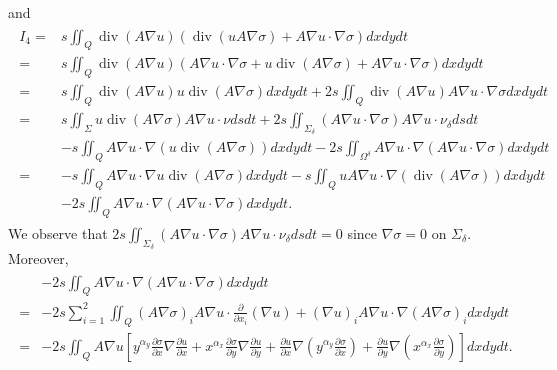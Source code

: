 \documentclass[9pt,reqno]{amsart}
\theoremstyle{plain}
\numberwithin{equation}{section}
\numberwithin{theorem}{section}
\DeclareMathOperator*{\Div}{\mathrm{div}}
\begin{document}
	and
	\begin{align*}
		\begin{split}
			I_4= & s \iint_Q \Div(A \nabla u)\left(  \Div(u A \nabla \sigma)+ A \nabla u \cdot \nabla \sigma\right)  dx dy dt \\%
			= & s \iint_Q \Div(A \nabla u)\left( A \nabla u \cdot \nabla \sigma+ u \Div(A \nabla \sigma)+ A \nabla u \cdot \nabla \sigma\right)  dx dy dt \\%
			= & s \iint_Q \Div(A \nabla u) u \Div(A \nabla \sigma)dx dy dt + 2s \iint_Q \Div(A \nabla u) A \nabla u \cdot \nabla \sigma   dx dy dt \\%
			= & s \iint_\Sigma u \Div(A \nabla \sigma )A \nabla u \cdot \nu dsdt + 2s \iint_{\Sigma_\delta}  (A \nabla u \cdot \nabla \sigma) A \nabla u \cdot \nu_\delta ds dt \\%
			&-s \iint_Q A \nabla u \cdot  \nabla\left( u \Div(A \nabla \sigma)\right) dx dy dt -2s \iint_{\Omega^\delta} A \nabla u\cdot \nabla \left( A \nabla u \cdot \nabla \sigma \right)  dx dy dt \\%
			= &
			-s \iint_Q A \nabla u \cdot  \nabla u \Div(A \nabla \sigma)dx dy dt-s \iint_Q u A \nabla u\cdot \nabla (\Div(A \nabla \sigma)) dx dy dt\\%
			&-2s \iint_{Q} A \nabla u\cdot \nabla(A \nabla u \cdot \nabla \sigma)   dx dy dt. 
		\end{split}
	\end{align*}
	We observe that $2s \iint_{\Sigma_\delta} (A \nabla u \cdot \nabla \sigma) A \nabla u \cdot \nu_\delta  ds  dt = 0$ since $\nabla \sigma = 0$ on $\Sigma_\delta$. Moreover,
	\begin{align*}
		\begin{split}
			&-2s \iint_{Q} A \nabla u \cdot \nabla (A\nabla u \cdot \nabla \sigma) dx dydt\\
			=&-2s \sum_{i=1}^{2} \iint_{Q} (A\nabla \sigma)_i A \nabla u \cdot \frac{\partial}{\partial x_i}(\nabla u) + (\nabla u)_i A \nabla u \cdot \nabla (A \nabla \sigma)_i dx dydt\\
			=&-2s \iint_{Q} A \nabla u \left[ y^{\alpha_y} \frac{\partial \sigma}{\partial x}\nabla \frac{\partial u}{\partial x}  + x^{\alpha_x} \frac{\partial \sigma}{\partial y}\nabla \frac{\partial u}{\partial y} + \frac{\partial u}{\partial x} \nabla (y^{\alpha_y} \frac{\partial \sigma}{\partial x}) + \frac{\partial u}{\partial y} \nabla (x^{\alpha_x} \frac{\partial \sigma}{\partial y}) \right] dx dydt.
		\end{split}
	\end{align*}
\end{document}
